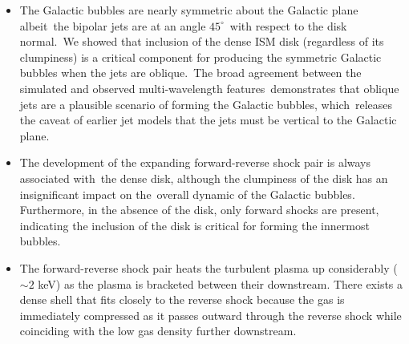 \documentclass[fleqn,usenatbib,useAMS]{mnras}
\begin{document}
\begin{itemize}

\item The Galactic bubbles are nearly symmetric about the Galactic plane albeit\
      the bipolar jets are at an angle $45^{\circ}$\
      with respect to the disk normal.\
      We showed that inclusion of the dense ISM disk (regardless of its clumpiness) is a critical component for producing the symmetric Galactic bubbles when the jets are oblique.\
      The broad agreement between the simulated and observed multi-wavelength features\
      demonstrates that oblique jets are a plausible scenario of forming the Galactic bubbles, which\
      releases the caveat of earlier jet models that the jets must be vertical to the Galactic plane.\


\item The development of the expanding forward-reverse shock pair is always associated with\
the dense disk, although the clumpiness of the disk has an insignificant impact on the\
overall dynamic of the Galactic bubbles.
Furthermore, in the absence of the disk, only forward shocks are present,
indicating the inclusion of the disk is critical for forming the innermost bubbles.

\item The forward-reverse shock pair heats the turbulent plasma up considerably ($\sim2$ keV) as the plasma is bracketed between their downstream. There exists a dense shell that fits closely to the reverse shock because the gas is immediately compressed as it passes outward through the reverse shock while coinciding with the low gas density further downstream.


\end{itemize}
\end{document}
